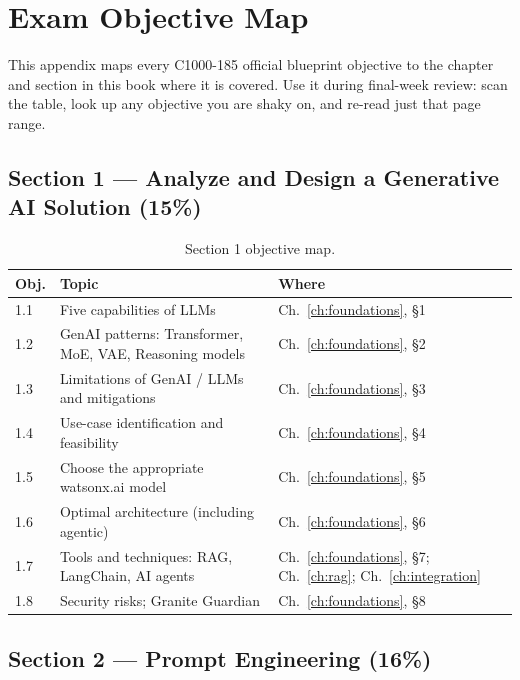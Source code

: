 \chapter{Exam Objective Map}
\label{app:objective-map}

This appendix maps every C1000-185 official blueprint objective to the chapter and section in this book where it is covered. Use it during final-week review: scan the table, look up any objective you are shaky on, and re-read just that page range.

\section*{Section 1 --- Analyze and Design a Generative AI Solution (15\%)}

\begin{table}[h]
\centering
\small
\begin{tabularx}{\textwidth}{l X l}
\toprule
\textbf{Obj.} & \textbf{Topic} & \textbf{Where} \\
\midrule
1.1 & Five capabilities of LLMs                                & Ch.~\ref{ch:foundations}, \S 1 \\
1.2 & GenAI patterns: Transformer, MoE, VAE, Reasoning models  & Ch.~\ref{ch:foundations}, \S 2 \\
1.3 & Limitations of GenAI / LLMs and mitigations              & Ch.~\ref{ch:foundations}, \S 3 \\
1.4 & Use-case identification and feasibility                  & Ch.~\ref{ch:foundations}, \S 4 \\
1.5 & Choose the appropriate watsonx.ai model                  & Ch.~\ref{ch:foundations}, \S 5 \\
1.6 & Optimal architecture (including agentic)                 & Ch.~\ref{ch:foundations}, \S 6 \\
1.7 & Tools and techniques: RAG, LangChain, AI agents          & Ch.~\ref{ch:foundations}, \S 7; Ch.~\ref{ch:rag}; Ch.~\ref{ch:integration} \\
1.8 & Security risks; Granite Guardian                         & Ch.~\ref{ch:foundations}, \S 8 \\
\bottomrule
\end{tabularx}
\caption{Section 1 objective map.}
\end{table}

\section*{Section 2 --- Prompt Engineering (16\%)}

